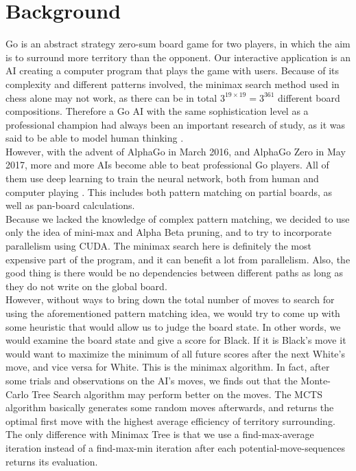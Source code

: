 \documentclass[11pt]{article}
\begin{document}
\section*{Background}
Go is an abstract strategy zero-sum board game for two players, in which the aim is to surround more territory than the opponent. Our interactive application is an AI creating a computer program that plays the game with users. Because of its complexity and different patterns involved, the minimax search method used in chess alone may not work, as there can be in total $3^{19 \times 19} = 3^{361}$ different board compositions. Therefore a Go AI with the same sophistication level as a professional champion had always been an important research of study, as it was said to be able to model human thinking \cite{SN}.
\\
However, with the advent of AlphaGo in March 2016, and AlphaGo Zero in May 2017, more and more AIs become able to beat professional Go players. All of them use deep learning to train the neural network, both from human and computer playing \cite{NA}. This includes both pattern matching on partial boards, as well as pan-board calculations.\\
Because we lacked the knowledge of complex pattern matching, we decided to use only the idea of mini-max and Alpha Beta pruning, and to try to incorporate parallelism using CUDA. The minimax search here is definitely the most expensive part of the program, and it can benefit a lot from parallelism. Also, the good thing is there would be no dependencies between different paths as long as they do not write on the global board.\\
However, without ways to bring down the total number of moves to search for using the aforementioned pattern matching idea, we would try to come up with some heuristic that would allow us to judge the board state. In other words, we would examine the board state and give a score for Black. If it is Black's move it would want to maximize the minimum of all future scores after the next White's move, and vice versa for White. This is the minimax algorithm. In fact, after some trials and observations on the AI's moves, we finds out that the Monte-Carlo Tree Search algorithm may perform better on the moves. The MCTS algorithm basically generates some random moves afterwards, and returns the optimal first move with the highest average efficiency of territory surrounding. The only difference with Minimax Tree is that we use a find-max-average iteration instead of a find-max-min iteration after each potential-move-sequences returns its evaluation. \newline
\end{document}
